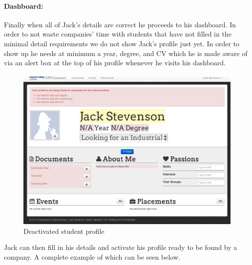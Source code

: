   \paragraph{Dashboard:}
    Finally when all of Jack's details are correct he proceeds to his dashboard. In order to not waste companies' time with students that have not filled in the minimal detail requirements we do not show Jack's profile just yet. In order to show up he needs at minimum a year, degree, and CV which he is made aware of via an alert box at the top of his profile whenever he visits his dashboard.

    \begin{figure}[H]\centering
    \includegraphics[scale=0.3]{images/user_experiences/student/jack_signup_profile}
    \caption{Deactivated student profile}
    \end{figure}

    Jack can then fill in his details and activate his profile ready to be found by a company.
    A complete example of which can be seen below.
    
